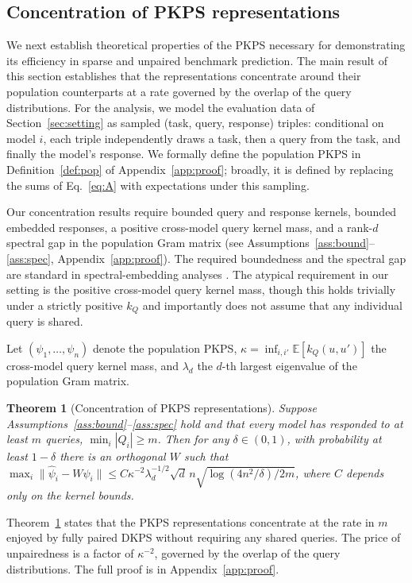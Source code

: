 \documentclass{article}
\newtheorem{theorem}{Theorem}
\theoremstyle{definition}
\theoremstyle{remark}
\theoremstyle{plain}
\newcommand{\PKPS}{PKPS\xspace}
\begin{document}
\subsection{Concentration of \PKPS representations}
\label{sec:theory}

We next establish theoretical properties of the \PKPS necessary for demonstrating
its efficiency in sparse and unpaired benchmark prediction.
The main result of this section establishes that the representations
concentrate around their population counterparts at a rate governed by the overlap of
the query distributions.
For the analysis, we model the evaluation data of Section~\ref{sec:setting} as
sampled (task, query, response) triples: conditional on model $i$, each triple
independently draws a task, then a query from the task, and finally the model's
response.
We formally define the population \PKPS in Definition~\ref{def:pop} of
Appendix~\ref{app:proof}; broadly, it is defined by replacing the sums of
Eq.~\eqref{eq:A} with expectations under this sampling.

Our concentration results require bounded query and response kernels, bounded
embedded responses, a positive cross-model query kernel mass, and a rank-$d$
spectral gap in the population Gram matrix (see
Assumptions~\ref{ass:bound}--\ref{ass:spec}, Appendix~\ref{app:proof}).
The required boundedness and the spectral gap are standard in spectral-embedding
analyses \citep{yu2015useful, acharyya2024consistent, acharyya2025concentration}.
The atypical requirement in our setting is the positive cross-model query kernel
mass, though this holds trivially under a strictly positive $k_Q$ and importantly
does not assume that any individual query is shared.

Let $(\psi_1,\dots,\psi_n)$ denote the population \PKPS, $\kappa=\inf_{i,i'}\mathbb{E}[k_Q(u,u')]$ the cross-model
query kernel mass, and $\lambda_d$ the $d$-th largest eigenvalue of the population Gram matrix.
\begin{theorem}[Concentration of \PKPS representations]
\label{prop:conc}
Suppose Assumptions~\ref{ass:bound}--\ref{ass:spec} hold and that every model has
responded to at least $m$ queries, $\min_i|Q_i|\ge m$. Then for any
$\delta\in(0,1)$, with probability at least $1-\delta$ there is an orthogonal $W$ such
that
$\max_i\|\hat\psi_i-W\psi_i\|\le
C\kappa^{-2}\lambda_d^{-1/2}\sqrt{d}\,n\sqrt{\log(4n^2/\delta)/2m}$,
where $C$ depends only on the kernel bounds.
\end{theorem}

Theorem~\ref{prop:conc} states that the \PKPS representations concentrate at the rate in $ m $ enjoyed by fully paired DKPS \citep{acharyya2025concentration} without requiring any shared queries.
The price of unpairedness is a factor of $\kappa^{-2}$, governed by
the overlap of the query distributions.
The full proof is in Appendix~\ref{app:proof}.
\end{document}
